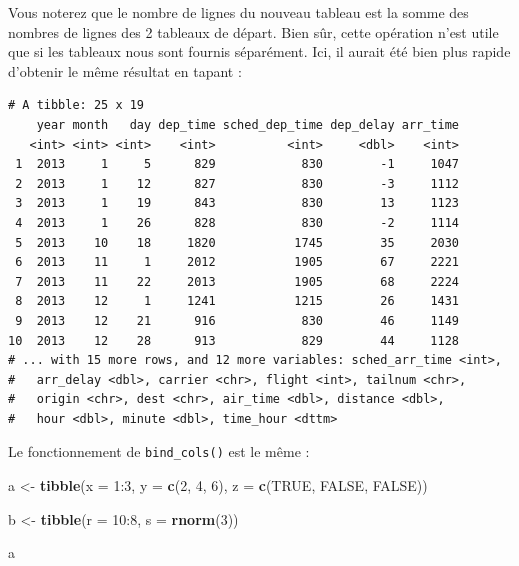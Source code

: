 \documentclass[a4paperpaper,]{article}
\newenvironment{Shaded}{\begin{snugshade}}{\end{snugshade}}
\newcommand{\DataTypeTok}[1]{\textcolor[rgb]{0.00,0.34,0.68}{#1}}
\newcommand{\DecValTok}[1]{\textcolor[rgb]{0.69,0.50,0.00}{#1}}
\newcommand{\KeywordTok}[1]{\textcolor[rgb]{0.12,0.11,0.11}{\textbf{#1}}}
\newcommand{\NormalTok}[1]{\textcolor[rgb]{0.12,0.11,0.11}{#1}}
\newcommand{\OperatorTok}[1]{\textcolor[rgb]{0.12,0.11,0.11}{#1}}
\newcommand{\OtherTok}[1]{\textcolor[rgb]{0.00,0.43,0.16}{#1}}
\newcommand{\StringTok}[1]{\textcolor[rgb]{0.75,0.01,0.01}{#1}}
\begin{document}
Vous noterez que le nombre de lignes du nouveau tableau est la somme des nombres de lignes des 2 tableaux de départ. Bien sûr, cette opération n'est utile que si les tableaux nous sont fournis séparément. Ici, il aurait été bien plus rapide d'obtenir le même résultat en tapant :

\begin{Shaded}
\end{Shaded}

\begin{verbatim}
# A tibble: 25 x 19
    year month   day dep_time sched_dep_time dep_delay arr_time
   <int> <int> <int>    <int>          <int>     <dbl>    <int>
 1  2013     1     5      829            830        -1     1047
 2  2013     1    12      827            830        -3     1112
 3  2013     1    19      843            830        13     1123
 4  2013     1    26      828            830        -2     1114
 5  2013    10    18     1820           1745        35     2030
 6  2013    11     1     2012           1905        67     2221
 7  2013    11    22     2013           1905        68     2224
 8  2013    12     1     1241           1215        26     1431
 9  2013    12    21      916            830        46     1149
10  2013    12    28      913            829        44     1128
# ... with 15 more rows, and 12 more variables: sched_arr_time <int>,
#   arr_delay <dbl>, carrier <chr>, flight <int>, tailnum <chr>,
#   origin <chr>, dest <chr>, air_time <dbl>, distance <dbl>,
#   hour <dbl>, minute <dbl>, time_hour <dttm>
\end{verbatim}

Le fonctionnement de \texttt{bind\_cols()} est le même :

\begin{Shaded}
\begin{Highlighting}[]
\NormalTok{a <-}\StringTok{ }\KeywordTok{tibble}\NormalTok{(}\DataTypeTok{x =} \DecValTok{1}\OperatorTok{:}\DecValTok{3}\NormalTok{, }
            \DataTypeTok{y =} \KeywordTok{c}\NormalTok{(}\DecValTok{2}\NormalTok{, }\DecValTok{4}\NormalTok{, }\DecValTok{6}\NormalTok{),}
            \DataTypeTok{z =} \KeywordTok{c}\NormalTok{(}\OtherTok{TRUE}\NormalTok{, }\OtherTok{FALSE}\NormalTok{, }\OtherTok{FALSE}\NormalTok{))}

\NormalTok{b <-}\StringTok{ }\KeywordTok{tibble}\NormalTok{(}\DataTypeTok{r =} \DecValTok{10}\OperatorTok{:}\DecValTok{8}\NormalTok{, }
            \DataTypeTok{s =} \KeywordTok{rnorm}\NormalTok{(}\DecValTok{3}\NormalTok{))}

\NormalTok{a}
\end{Highlighting}
\end{Shaded}
\end{document}
